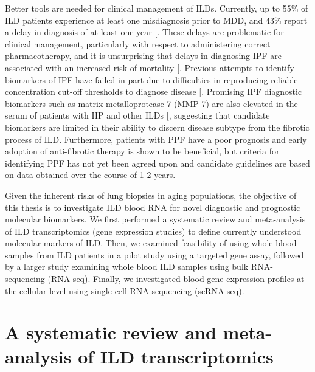 \documentclass[
]{article}
\begin{document}
Better tools are needed for clinical management of ILDs. Currently, up to 55\% of ILD patients experience at least one misdiagnosis prior to MDD, and 43\% report a delay in diagnosis of at least one year {[}\citeproc{ref-grewal_role_2019}{29}{]}. These delays are problematic for clinical management, particularly with respect to administering correct pharmacotherapy, and it is unsurprising that delays in diagnosing IPF are associated with an increased risk of mortality {[}\citeproc{ref-lamas_delayed_2011}{30}{]}. Previous attempts to identify biomarkers of IPF have failed in part due to difficulties in reproducing reliable concentration cut-off thresholds to diagnose disease {[}\citeproc{ref-drakopanagiotakis_biomarkers_2018}{31}{]}. Promising IPF diagnostic biomarkers such as matrix metalloprotease-7 (MMP-7) are also elevated in the serum of patients with HP and other ILDs {[}\citeproc{ref-morais_serum_2015}{32}{]}, suggesting that candidate biomarkers are limited in their ability to discern disease subtype from the fibrotic process of ILD. Furthermore, patients with PPF have a poor prognosis and early adoption of anti-fibrotic therapy is shown to be beneficial, but criteria for identifying PPF has not yet been agreed upon and candidate guidelines are based on data obtained over the course of 1-2 years.

Given the inherent risks of lung biopsies in aging populations, the objective of this thesis is to investigate ILD blood RNA for novel diagnostic and prognostic molecular biomarkers. We first performed a systematic review and meta-analysis of ILD transcriptomics (gene expression studies) to define currently understood molecular markers of ILD. Then, we examined feasibility of using whole blood samples from ILD patients in a pilot study using a targeted gene assay, followed by a larger study examining whole blood ILD samples using bulk RNA-sequencing (RNA-seq). Finally, we investigated blood gene expression profiles at the cellular level using single cell RNA-sequencing (scRNA-seq).

\clearpage

\section{A systematic review and meta-analysis of ILD transcriptomics}\label{a-systematic-review-and-meta-analysis-of-ild-transcriptomics}

\renewcommand{\thefigure}{2.\arabic{figure}}
\setcounter{figure}{0}
\renewcommand{\thetable}{2.\arabic{table}}
\setcounter{table}{0}
\renewcommand{\theequation}{2.\arabic{equation}}
\setcounter{equation}{0}
\end{document}
